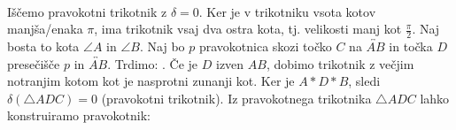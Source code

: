 \begin{dokaz}
\begin{enumerate}
                \\ Iščemo pravokotni trikotnik z $\delta=0$. Ker je v trikotniku vsota kotov manjša/enaka $\pi$, ima trikotnik vsaj dva ostra kota, tj. velikosti manj kot $\frac{\pi}{2}$. Naj bosta to kota $\angle A$ in $\angle B$. Naj bo $p$ pravokotnica skozi točko $C$ na $\overleftrightarrow{AB}$ in točka $D$ presečišče $p$ in $\overleftrightarrow{AB}$. Trdimo: . Če je $D$ izven $AB$, dobimo trikotnik z večjim notranjim kotom kot je nasprotni zunanji kot. Ker je $A\ast D\ast B$, sledi $\delta(\triangle ADC)=0$ (pravokotni trikotnik). 
                Iz pravokotnega trikotnika $\triangle ADC$ lahko konstruiramo pravokotnik: 
                \\ 
\end{enumerate}
\end{dokaz}
